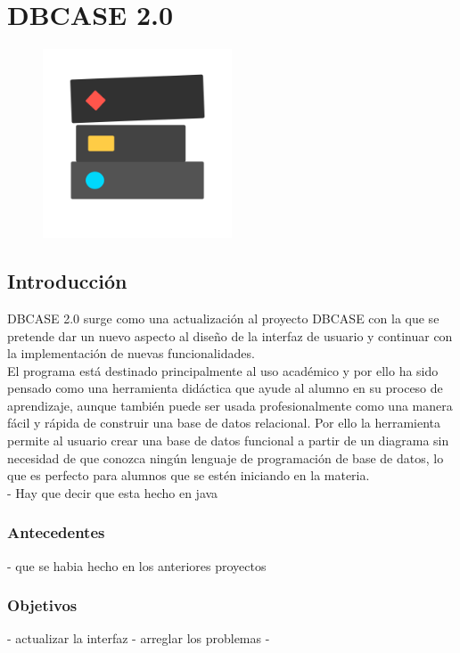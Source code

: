 \chapter{DBCASE 2.0}
\begin{figure}[H]
    \centering
    \includegraphics[width=0.5\textwidth]{img/DBCase_logo.png}
\end{figure}
\section{Introducción}
DBCASE 2.0 surge como una actualización al proyecto DBCASE con la que se pretende dar un nuevo aspecto al diseño de la interfaz de usuario y continuar con la implementación de nuevas funcionalidades.\\

El programa está destinado principalmente al uso académico y por ello ha sido pensado como una herramienta didáctica que ayude al alumno en su proceso de aprendizaje, aunque también puede ser usada profesionalmente como una manera fácil y rápida de construir una base de datos relacional. Por ello la herramienta permite al usuario crear una base de datos funcional a partir de un diagrama sin necesidad de que conozca ningún lenguaje de programación de base de datos, lo que es perfecto para alumnos que se estén iniciando en la materia.\\

- Hay que decir que esta hecho en java
\subsection{Antecedentes}
- que se habia hecho en los anteriores proyectos
\subsection{Objetivos}
- actualizar la interfaz
- arreglar los problemas
- 

